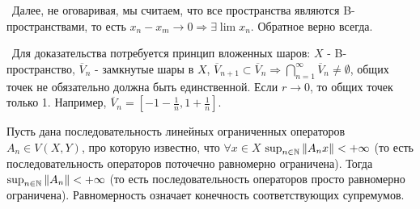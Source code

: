 \noindent\textbullet~Далее, не оговаривая, мы считаем, что все пространства являются B-пространствами, то есть $x_n - x_m \to 0 \Rightarrow \exists \lim x_n$.
Обратное верно всегда.

\smallskip 
\noindent\textbullet~Для доказательства потребуется принцип вложенных шаров: $X$ - B-пространство, $\overline{V}_n$ - замкнутые шары в $X$, $\overline{V}_{n+1} \subset 
\overline{V}_n \Rightarrow \bigcap_{n = 1}^\infty \overline{V}_n \neq \emptyset$, общих точек не обязательно должна быть единственной. 
Если $r \to 0$, то общих точек только 1. Например, $\overline{V}_n = [-1 - \frac{1}{n}, 1 + \frac{1}{n}]$.

\begin{theorem*}
Пусть дана последовательность линейных ограниченных операторов $A_n \in V(X, Y)$, про которую известно, что $\forall x \in X$ $\sup_{n \in \mathbb{N}}\left\lVert A_n x\right\rVert < 
+ \infty$ (то есть последовательность операторов поточечно равномерно ограничена). Тогда $\sup_{n \in \mathbb{N}} \left\lVert A_n\right\rVert < + \infty$ (то есть последовательность 
операторов просто равномерно ограничена). Равномерность означает конечность соответствующих супремумов.
\end{theorem*}

